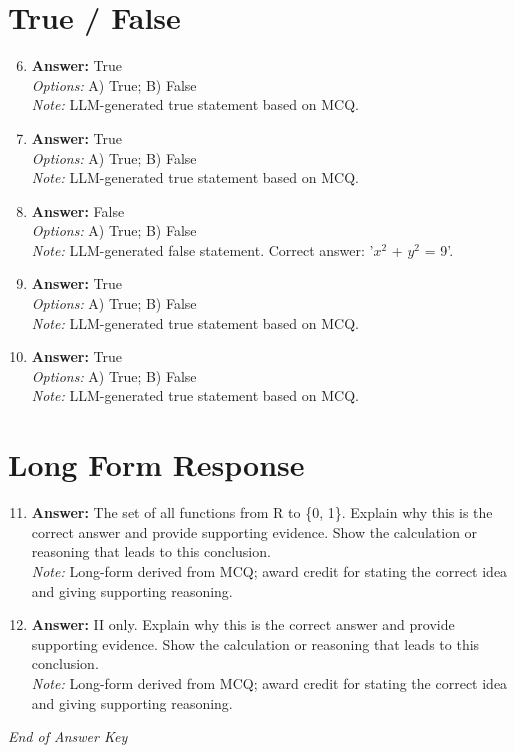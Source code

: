 \documentclass[12pt]{article}
\begin{document}
\section*{True / False}
\begin{enumerate}[label=\arabic*.]
\setcounter{enumi}{5}
\item \textbf{Answer:} True
\\ \textit{Options:} A) True; B) False
\\ \textit{Note:} LLM-generated true statement based on MCQ.
\item \textbf{Answer:} True
\\ \textit{Options:} A) True; B) False
\\ \textit{Note:} LLM-generated true statement based on MCQ.
\item \textbf{Answer:} False
\\ \textit{Options:} A) True; B) False
\\ \textit{Note:} LLM-generated false statement. Correct answer: '$x^2$ + $y^2$ = 9'.
\item \textbf{Answer:} True
\\ \textit{Options:} A) True; B) False
\\ \textit{Note:} LLM-generated true statement based on MCQ.
\item \textbf{Answer:} True
\\ \textit{Options:} A) True; B) False
\\ \textit{Note:} LLM-generated true statement based on MCQ.
\end{enumerate}

\section*{Long Form Response}
\begin{enumerate}[label=\arabic*.]
\setcounter{enumi}{10}
\item \textbf{Answer:} The set of all functions from R to \{0, 1\}. Explain why this is the correct answer and provide supporting evidence. Show the calculation or reasoning that leads to this conclusion.
\\ \textit{Note:} Long-form derived from MCQ; award credit for stating the correct idea and giving supporting reasoning.
\item \textbf{Answer:} II only. Explain why this is the correct answer and provide supporting evidence. Show the calculation or reasoning that leads to this conclusion.
\\ \textit{Note:} Long-form derived from MCQ; award credit for stating the correct idea and giving supporting reasoning.
\end{enumerate}

\vfill
\noindent\textit{End of Answer Key}
\end{document}
